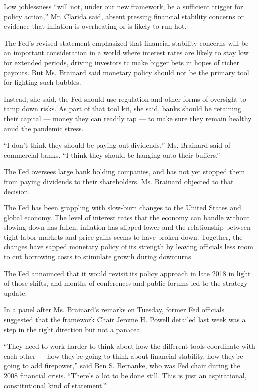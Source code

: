 Low joblessness ``will not, under our new framework, be a sufficient
trigger for policy action,'' Mr. Clarida said, absent pressing financial
stability concerns or evidence that inflation is overheating or is
likely to run hot.

The Fed's revised statement emphasized that financial stability concerns
will be an important consideration in a world where interest rates are
likely to stay low for extended periods, driving investors to make
bigger bets in hopes of richer payouts. But Ms. Brainard said monetary
policy should not be the primary tool for fighting such bubbles.

Instead, she said, the Fed should use regulation and other forms of
oversight to tamp down risks. As part of that tool kit, she said, banks
should be retaining their capital --- money they can readily tap --- to
make sure they remain healthy amid the pandemic stress.

``I don't think they should be paying out dividends,'' Ms. Brainard said
of commercial banks. ``I think they should be hanging onto their
buffers.''

The Fed oversees large bank holding companies, and has not yet stopped
them from paying dividends to their shareholders.
\href{https://www.federalreserve.gov/newsevents/pressreleases/brainard-statement-20200625c.htm}{Ms.
Brainard objected} to that decision.

The Fed has been grappling with slow-burn changes to the United States
and global economy. The level of interest rates that the economy can
handle without slowing down has fallen, inflation has slipped lower and
the relationship between tight labor markets and price gains seems to
have broken down. Together, the changes have sapped monetary policy of
its strength by leaving officials less room to cut borrowing costs to
stimulate growth during downturns.

The Fed announced that it would revisit its policy approach in late 2018
in light of those shifts, and months of conferences and public forums
led to the strategy update.

In a panel after Ms. Brainard's remarks on Tuesday, former Fed officials
suggested that the framework Chair Jerome H. Powell detailed last week
was a step in the right direction but not a panacea.

``They need to work harder to think about how the different tools
coordinate with each other --- how they're going to think about
financial stability, how they're going to add firepower,'' said Ben S.
Bernanke, who was Fed chair during the 2008 financial crisis. ``There's
a lot to be done still. This is just an aspirational, constitutional
kind of statement.''

